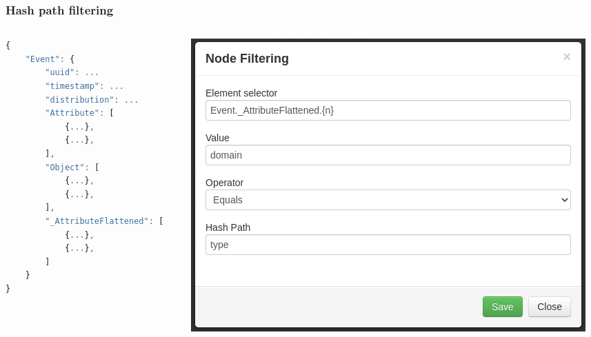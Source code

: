 \begin{frame}[fragile]
    \frametitle{Hash path filtering}

    \begin{columns}
        \begin{column}{0.5\textwidth}
\begin{lstlisting}[language=javascript,firstnumber=1]
{
    "Event": {
        "uuid": ...
        "timestamp": ...
        "distribution": ...
        "Attribute": [
            {...},
            {...},
        ],
        "Object": [
            {...},
            {...},
        ],
        "_AttributeFlattened": [
            {...},
            {...},
        ]
    }
}
\end{lstlisting}
        \end{column}
        \begin{column}{0.5\textwidth}
            \begin{center}
                \includegraphics[width=1.0\linewidth]{pictures/node-filtering.png}
            \end{center}
        \end{column}
    \end{columns}
\end{frame}

